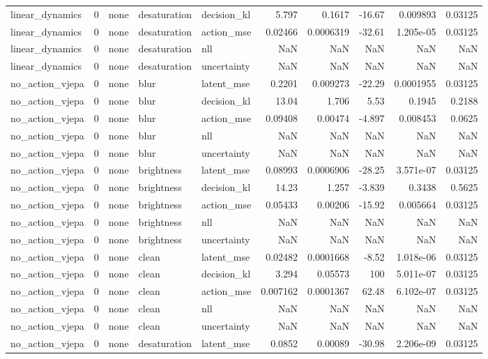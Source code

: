\begin{tabular}{lrlllrrrrr}
linear\_dynamics & 0 & none & desaturation & decision\_kl & 5.797 & 0.1617 & -16.67 & 0.009893 & 0.03125 \\
linear\_dynamics & 0 & none & desaturation & action\_mse & 0.02466 & 0.0006319 & -32.61 & 1.205e-05 & 0.03125 \\
linear\_dynamics & 0 & none & desaturation & nll & NaN & NaN & NaN & NaN & NaN \\
linear\_dynamics & 0 & none & desaturation & uncertainty & NaN & NaN & NaN & NaN & NaN \\
no\_action\_vjepa & 0 & none & blur & latent\_mse & 0.2201 & 0.009273 & -22.29 & 0.0001955 & 0.03125 \\
no\_action\_vjepa & 0 & none & blur & decision\_kl & 13.04 & 1.706 & 5.53 & 0.1945 & 0.2188 \\
no\_action\_vjepa & 0 & none & blur & action\_mse & 0.09408 & 0.00474 & -4.897 & 0.008453 & 0.0625 \\
no\_action\_vjepa & 0 & none & blur & nll & NaN & NaN & NaN & NaN & NaN \\
no\_action\_vjepa & 0 & none & blur & uncertainty & NaN & NaN & NaN & NaN & NaN \\
no\_action\_vjepa & 0 & none & brightness & latent\_mse & 0.08993 & 0.0006906 & -28.25 & 3.571e-07 & 0.03125 \\
no\_action\_vjepa & 0 & none & brightness & decision\_kl & 14.23 & 1.257 & -3.839 & 0.3438 & 0.5625 \\
no\_action\_vjepa & 0 & none & brightness & action\_mse & 0.05433 & 0.00206 & -15.92 & 0.005664 & 0.03125 \\
no\_action\_vjepa & 0 & none & brightness & nll & NaN & NaN & NaN & NaN & NaN \\
no\_action\_vjepa & 0 & none & brightness & uncertainty & NaN & NaN & NaN & NaN & NaN \\
no\_action\_vjepa & 0 & none & clean & latent\_mse & 0.02482 & 0.0001668 & -8.52 & 1.018e-06 & 0.03125 \\
no\_action\_vjepa & 0 & none & clean & decision\_kl & 3.294 & 0.05573 & 100 & 5.011e-07 & 0.03125 \\
no\_action\_vjepa & 0 & none & clean & action\_mse & 0.007162 & 0.0001367 & 62.48 & 6.102e-07 & 0.03125 \\
no\_action\_vjepa & 0 & none & clean & nll & NaN & NaN & NaN & NaN & NaN \\
no\_action\_vjepa & 0 & none & clean & uncertainty & NaN & NaN & NaN & NaN & NaN \\
no\_action\_vjepa & 0 & none & desaturation & latent\_mse & 0.0852 & 0.00089 & -30.98 & 2.206e-09 & 0.03125 \\

\end{tabular}
